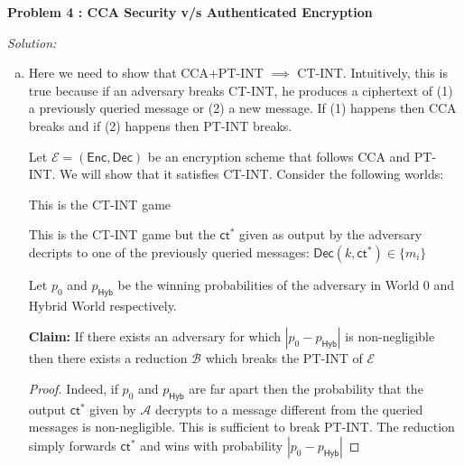 \documentclass[a4paper, 11pt]{article}
\newenvironment{solution}
    {\textit{Solution:}}
    {\clearpage}
\newcommand{\prob}[1]{\begin{mdframed}[backgroundcolor=gray!20] \textbf{Problem #1}\end{mdframed}}
\newcommand{\ct}{\mathsf{ct}}
\newcommand{\hyb}{\mathsf{Hyb}}
\newcommand{\enc}{\mathsf{Enc}}
\newcommand{\dec}{\mathsf{Dec}}
\newcommand{\calA}{\mathcal{A}}
\newcommand{\calB}{\mathcal{B}}
\newcommand{\calE}{\mathcal{E}}
\begin{document}
\prob{4 : CCA Security v/s Authenticated Encryption}
\begin{solution}
    \begin{enumerate}[(a)]
        \item Here we need to show that CCA+PT-INT $\implies$ CT-INT. Intuitively, this is true because if an adversary breaks CT-INT, he produces a ciphertext of (1) a previously queried message or (2) a new message. If (1) happens then CCA breaks and if (2) happens then PT-INT breaks.

              Let $\calE=(\enc,\dec)$ be an encryption scheme that follows CCA and PT-INT. We will show that it satisfies CT-INT. Consider the following worlds:
              \begin{world}[World 0:]
                  This is the CT-INT game
              \end{world}

              \begin{world}
                  This is the CT-INT game but the $\ct^*$ given as output by the adversary decripts to one of the previously queried messages: $\dec(k,\ct^*)\in\{m_i\}$
              \end{world}

              Let $p_0$ and $p_\hyb$ be the winning probabilities of the adversary in World 0 and Hybrid World respectively.

              \textbf{Claim:} If there exists an adversary for which $|p_0-p_\hyb|$ is non-negligible then there exists a reduction $\calB$ which breaks the PT-INT of $\calE$
              \begin{proof}
                  Indeed, if $p_0$ and $p_\hyb$ are far apart then the probability that the output $\ct^*$ given by $\calA$ decrypts to a message different from the queried messages is non-negligible. This is sufficient to break PT-INT. The reduction simply forwards $\ct^*$ and wins with probability $|p_0-p_\hyb|$
              \end{proof}


\end{enumerate}
\end{solution}
\end{document}
